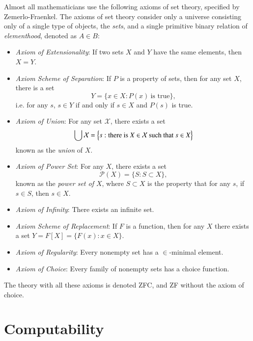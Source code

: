 Almost all mathematicians use the following axioms of set theory, specified by Zemerlo-Fraenkel. The axioms of set theory consider only a universe consisting only of a single type of objects, the \emph{sets}, and a single primitive binary relation of \emph{elementhood}, denoted as $A \in B$:
%
\begin{itemize}
    \item \emph{Axiom of Extensionality}: If two sets $X$ and $Y$ have the same elements, then $X = Y$.

    \item \emph{Axiom Scheme of Separation}: If $P$ is a property of sets, then for any set $X$, there is a set
    \[ Y = \{ x \in X : P(x)\ \text{is true} \}, \]
    i.e. for any $s$, $s \in Y$ if and only if $s \in X$ and $P(s)$ is true.

    \item \emph{Axiom of Union}: For any set $\mathcal{X}$, there exists a set
    \[ \bigcup \mathcal{X} = \Big\{ s: \text{there is $X \in \mathcal{X}$\ \text{such that} $s \in X$} \Big\} \]
    known as the \emph{union} of $X$.

    \item \emph{Axiom of Power Set}: For any $X$, there exists a set
    \[ \mathcal{P}(X) = \{ S : S \subset X \}, \]
    known as the \emph{power set of $X$}, where $S \subset X$ is the property that for any $s$, if $s \in S$, then $s \in X$.

    \item \emph{Axiom of Infinity}: There exists an infinite set.

    \item \emph{Axiom Scheme of Replacement}: If $F$ is a function, then for any $X$ there exists a set $Y = F[X] = \{ F(x): x \in X \}$.

    \item \emph{Axiom of Regularity}: Every nonempty set has a $\in$-minimal element.

    \item \emph{Axiom of Choice}: Every family of nonempty sets has a choice function.
\end{itemize}
%
The theory with all these axioms is denoted ZFC, and ZF without the axiom of choice.












\part{Computability}

